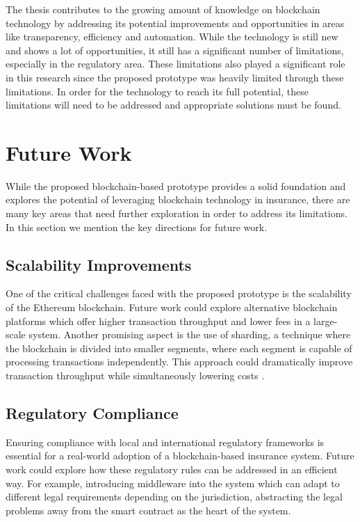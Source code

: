 The thesis contributes to the growing amount of knowledge on blockchain technology by addressing its potential improvements and opportunities in areas like transparency, efficiency and automation. While the technology is still new and shows a lot of opportunities, it still has a significant number of limitations, especially in the regulatory area. These limitations also played a significant role in this research since the proposed prototype was heavily limited through these limitations. In order for the technology to reach its full potential, these limitations will need to be addressed and appropriate solutions must be found.

\section{Future Work}\label{section:future_work}
While the proposed blockchain-based prototype provides a solid foundation and explores the potential of leveraging blockchain technology in insurance, there are many key areas that need further exploration in order to address its limitations. In this section we mention the key directions for future work.

\subsection{Scalability Improvements}
One of the critical challenges faced with the proposed prototype is the scalability of the Ethereum blockchain. Future work could explore alternative blockchain platforms which offer higher transaction throughput and lower fees in a large-scale system. Another promising aspect is the use of sharding, a technique where the blockchain is divided into smaller segments, where each segment is capable of processing transactions independently. This approach could dramatically improve transaction throughput while simultaneously lowering costs \autocite{Hong2022Scaling}.

\subsection{Regulatory Compliance}
Ensuring compliance with local and international regulatory frameworks is essential for a real-world adoption of a blockchain-based insurance system. Future work could explore how these regulatory rules can be addressed in an efficient way. For example, introducing middleware into the system which can adapt to different legal requirements depending on the jurisdiction, abstracting the legal problems away from the smart contract as the heart of the system.

